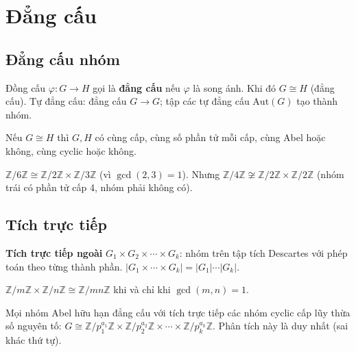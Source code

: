 \documentclass[12pt,a4paper]{article}
\begin{document}
\section{Đẳng cấu}

\subsection{Đẳng cấu nhóm}

\begin{dinhnghia}
  Đồng cấu $\varphi: G \to H$ gọi là \textbf{đẳng cấu} nếu $\varphi$ là song ánh. Khi đó $G \cong H$ (đẳng cấu). Tự đẳng cấu: đẳng cấu $G \to G$; tập các tự đẳng cấu $\mathrm{Aut}(G)$ tạo thành nhóm.
\end{dinhnghia}

\begin{tinhchat}
  Nếu $G \cong H$ thì $G, H$ có cùng cấp, cùng số phần tử mỗi cấp, cùng Abel hoặc không, cùng cyclic hoặc không.
\end{tinhchat}

\begin{vidu}
  $\mathbb{Z}/6\mathbb{Z} \cong \mathbb{Z}/2\mathbb{Z} \times \mathbb{Z}/3\mathbb{Z}$ (vì $\gcd(2,3) = 1$). Nhưng $\mathbb{Z}/4\mathbb{Z} \not\cong \mathbb{Z}/2\mathbb{Z} \times \mathbb{Z}/2\mathbb{Z}$ (nhóm trái có phần tử cấp 4, nhóm phải không có).
\end{vidu}

\subsection{Tích trực tiếp}

\begin{dinhnghia}
  \textbf{Tích trực tiếp ngoài} $G_1 \times G_2 \times \cdots \times G_k$: nhóm trên tập tích Descartes với phép toán theo từng thành phần. $|G_1 \times \cdots \times G_k| = |G_1| \cdots |G_k|$.
\end{dinhnghia}

\begin{dinhly}
  $\mathbb{Z}/m\mathbb{Z} \times \mathbb{Z}/n\mathbb{Z} \cong \mathbb{Z}/mn\mathbb{Z}$ khi và chỉ khi $\gcd(m, n) = 1$.
\end{dinhly}

\begin{dinhly}[title={Định lý cơ bản về nhóm Abel hữu hạn}]
  Mọi nhóm Abel hữu hạn đẳng cấu với tích trực tiếp các nhóm cyclic cấp lũy thừa số nguyên tố:
  $G \cong \mathbb{Z}/p_1^{a_1}\mathbb{Z} \times \mathbb{Z}/p_2^{a_2}\mathbb{Z} \times \cdots \times \mathbb{Z}/p_k^{a_k}\mathbb{Z}$.
  Phân tích này là duy nhất (sai khác thứ tự).
\end{dinhly}
\end{document}
